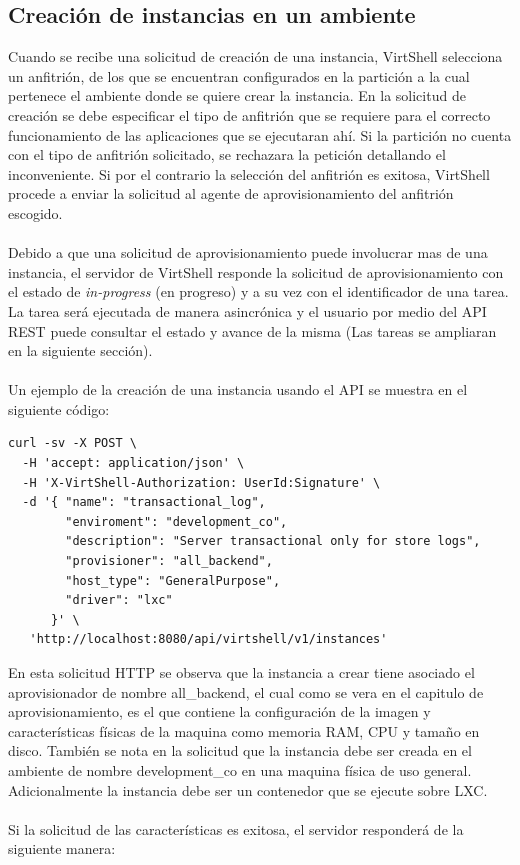 \subsection{Creación de instancias en un ambiente}
Cuando se recibe una solicitud de creación de una instancia, VirtShell selecciona un anfitrión, de los que se encuentran configurados en la partición a la cual pertenece el ambiente donde se quiere crear la instancia. En la solicitud de creación se debe especificar el tipo de anfitrión que se requiere para el correcto funcionamiento de las aplicaciones que se ejecutaran ahí. Si la partición no cuenta con el tipo de anfitrión solicitado, se rechazara la petición detallando el inconveniente. Si por el contrario la selección del anfitrión es exitosa, VirtShell procede a enviar la solicitud al agente de aprovisionamiento del anfitrión escogido. \\
\\
Debido a que una solicitud de aprovisionamiento puede involucrar mas de una instancia, el servidor de VirtShell responde la solicitud de aprovisionamiento con el estado de \emph{in-progress} (en progreso) y a su vez con el identificador de una tarea. La tarea será ejecutada de manera asincrónica y el usuario por medio del API REST puede consultar el estado y avance de la misma (Las tareas se ampliaran en la siguiente sección).\\
\\
Un ejemplo de la creación de una instancia usando el API se muestra en el siguiente código:

\begin{lstlisting}[style=json, caption=Petición HTTP para crear una instancia]
curl -sv -X POST \
  -H 'accept: application/json' \
  -H 'X-VirtShell-Authorization: UserId:Signature' \
  -d '{ "name": "transactional_log",
        "enviroment": "development_co",
        "description": "Server transactional only for store logs", 
        "provisioner": "all_backend",
        "host_type": "GeneralPurpose",
        "driver": "lxc"
      }' \
   'http://localhost:8080/api/virtshell/v1/instances'
\end{lstlisting}

\vspace{5mm}

En esta solicitud HTTP se observa que la instancia a crear tiene asociado el aprovisionador de nombre all\_backend, el cual como se vera en el capitulo de aprovisionamiento, es el que contiene la configuración de la imagen y características físicas de la maquina como memoria RAM, CPU y tamaño en disco. También se nota en la solicitud que la instancia debe ser creada en el ambiente de nombre development\_co en una maquina física de uso general. Adicionalmente la instancia debe ser un contenedor que se ejecute sobre LXC.\\
\\
Si la solicitud de las características es exitosa, el servidor responderá de la siguiente manera:

